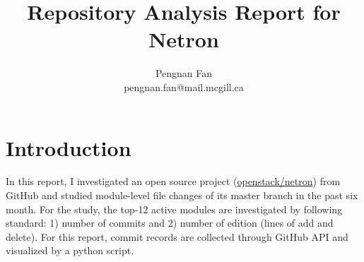 \documentclass[11pt]{article}
\begin{document}
 
\title{Repository Analysis Report for Netron}
\author{Pengnan Fan \\ pengnan.fan@mail.mcgill.ca}

\maketitle

\section{Introduction}
In this report, I investigated an open source project (\href{https://github.com/openstack/neutron}{openstack/netron}) from GitHub and studied module-level file changes of its master branch in the past six month. For the study, the top-12 active modules are investigated by following standard: 1) number of commits and 2) number of edition (lines of add and delete). For this report, commit records are collected through GitHub API and visualized by a python script.
\end{document}
